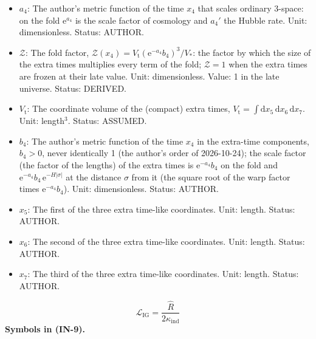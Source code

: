 \documentclass[
  10pt,
]{article}
\begin{document}
\begin{itemize}
  \(\mathrm{e}\): Euler's number, the base of the natural logarithm;
  \(\mathrm{e}^{X}\) is the exponential of \(X\). Unit: dimensionless.
  Value: 2.718281828. Status: STANDARD.
\item
  \(a_4\): The author's metric function of the time \(x_4\) that scales
  ordinary 3-space: on the fold \(\mathrm{e}^{a_4}\) is the scale factor
  of cosmology and \(a_4'\) the Hubble rate. Unit: dimensionless.
  Status: AUTHOR.
\item
  \(\mathcal{Z}\): The fold factor,
  \(\mathcal{Z}(x_4) = V_{\mathrm{t}}(\mathrm{e}^{-a_4}b_4)^3/V_*\): the
  factor by which the size of the extra times multiplies every term of
  the fold; \(\mathcal{Z} = 1\) when the extra times are frozen at their
  late value. Unit: dimensionless. Value: 1 in the late universe.
  Status: DERIVED.
\item
  \(V_{\mathrm{t}}\): The coordinate volume of the (compact) extra
  times,
  \(V_{\mathrm{t}} = \int\mathrm{d}x_5\,\mathrm{d}x_6\,\mathrm{d}x_7\).
  Unit: length\(^3\). Status: ASSUMED.
\item
  \(b_4\): The author's metric function of the time \(x_4\) in the
  extra-time components, \(b_4 > 0\), never identically 1 (the author's
  order of 2026-10-24); the scale factor (the factor of the lengths) of
  the extra times is \(\mathrm{e}^{-a_4}b_4\) on the fold and
  \(\mathrm{e}^{-a_4}b_4\,\mathrm{e}^{-H\lvert\sigma\rvert}\) at the
  distance \(\sigma\) from it (the square root of the warp factor times
  \(\mathrm{e}^{-a_4}b_4\)). Unit: dimensionless. Status: AUTHOR.
\item
  \(x_5\): The first of the three extra time-like coordinates. Unit:
  length. Status: AUTHOR.
\item
  \(x_6\): The second of the three extra time-like coordinates. Unit:
  length. Status: AUTHOR.
\item
  \(x_7\): The third of the three extra time-like coordinates. Unit:
  length. Status: AUTHOR.
\end{itemize}

\[
\mathcal{L}_{\mathrm{IG}} = \frac{\hat R}{2\kappa_{\mathrm{ind}}} \tag{IN-9}
\] \textbf{Symbols in (IN-9).}
\end{document}

